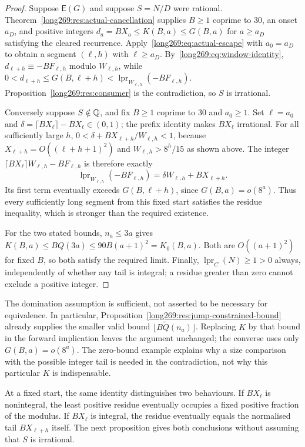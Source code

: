 \documentclass[11pt]{article}
\theoremstyle{remark}
\theoremstyle{plain}
\newcommand{\lpr}{\operatorname{lpr}}
\newcommand{\Esc}{\mathsf E}
\begin{document}
\begin{proof}
Suppose $\Esc(G)$ and suppose $S=N/D$ were rational.
Theorem~\ref{long269:res:actual-cancellation} supplies $B\ge1$ coprime to $30$, an
onset $a_D$, and positive integers $d_a=BX_a\le K(B,a)\le G(B,a)$ for
$a\ge a_D$ satisfying the cleared recurrence.  Apply~\eqref{long269:eq:actual-escape}
with $a_0=a_D$ to obtain a segment $(\ell,h)$ with $\ell\ge a_D$.
By~\eqref{long269:eq:window-identity}, $d_{\ell+h}\equiv-BF_{\ell,h}$ modulo
$W_{\ell,h}$, while $0<d_{\ell+h}\le G(B,\ell+h)<\lpr_{W_{\ell,h}}(-BF_{\ell,h})$.
Proposition~\ref{long269:res:consumer} is the contradiction, so $S$ is irrational.

Conversely suppose $S\notin\mathbb{Q}$, and fix $B\ge1$ coprime to $30$ and
$a_0\ge1$.  Set $\ell=a_0$ and
$\delta=\lceil BX_\ell\rceil-BX_\ell\in(0,1)$; the prefix identity makes
$BX_\ell$ irrational.  For all sufficiently large $h$,
$0<\delta+BX_{\ell+h}/W_{\ell,h}<1$, because $X_{\ell+h}=O((\ell+h+1)^2)$ and
$W_{\ell,h}>8^h/15$ as shown above.
The integer $\lceil BX_\ell\rceil W_{\ell,h}-BF_{\ell,h}$ is therefore
exactly
\[
 \lpr_{W_{\ell,h}}(-BF_{\ell,h})
 =\delta W_{\ell,h}+BX_{\ell+h}.
\]
Its first term eventually exceeds $G(B,\ell+h)$, since
$G(B,a)=o(8^a)$.  Thus every sufficiently long segment from this fixed
start satisfies the residue inequality, which is stronger than the required existence.

For the two stated bounds, $n_a\le3a$ gives
$K(B,a)\le BQ(3a)\le90B(a+1)^2=K_0(B,a)$.
Both are $O((a+1)^2)$ for fixed $B$, so both satisfy the required limit.
Finally, $\lpr_C(N)\ge1>0$ always, independently of whether any tail is
integral; a residue greater than zero cannot exclude a positive integer.
\end{proof}

The domination assumption is sufficient, not asserted to be necessary
for equivalence.  In particular, Proposition~\ref{long269:res:jump-constrained-bound}
already supplies the smaller valid bound
$\lfloor B\widetilde Q(n_a)\rfloor$.  Replacing $K$ by that bound in the
forward implication leaves the argument unchanged; the converse uses only
$G(B,a)=o(8^a)$.  The zero-bound example explains why a size comparison
with the possible integer tail is needed in the contradiction, not why
this particular $K$ is indispensable.

At a fixed start, the same identity distinguishes two behaviours. If
$BX_\ell$ is nonintegral, the least positive residue eventually occupies
a fixed positive fraction of the modulus. If $BX_\ell$ is integral, the
residue eventually equals the normalised tail $BX_{\ell+h}$ itself.
The next proposition gives both conclusions without assuming that $S$
is irrational.
\end{document}

